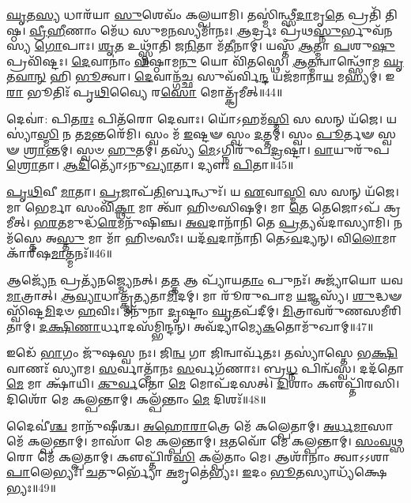 \-\ul{𑌘𑍃}\-𑌤\-\ul{𑌸𑍍𑌯} 𑌧𑌾𑌰᳴𑌯𑌾 \ul{𑌸𑍁}\-𑌶𑍇𑌵𑌂᳴ 𑌕𑌲𑍍𑌪𑌯𑌾𑌮𑌿।
𑌤𑌸𑍍𑌮𑌿॑𑌨𑍍𑌥𑍍𑌸𑍀\-\ul{𑌦𑌾}\-𑌮𑍃\-\ul{𑌤𑍇} 𑌪𑍍𑌰𑌤𑌿᳴ 𑌤𑌿𑌷𑍍𑌠।
\-\ul{𑌵𑍍𑌰𑍀}\-\-\ul{𑌹𑍀}\-𑌣𑌾𑌂 𑌮𑍇᳴𑌧 𑌸𑍁𑌮\-\ul{𑌨}\-𑌸𑍍𑌯𑌮𑌾᳴𑌨𑌃।
\-\ul{𑌆}\-𑌰𑍍𑌦𑍍𑌰𑌃 𑌪𑍍𑌰᳴𑌥\-\ul{𑌸𑍍𑌨𑍁}\-𑌰𑍍𑌭𑍁𑌵᳴𑌨𑌸𑍍𑌯 \ul{𑌗𑍋}\-𑌪𑌾𑌃।
\-\ul{𑌶𑍃}\-𑌤 𑌉𑌥𑍍𑌸𑍍𑌨𑌾᳴𑌤𑌿 𑌜\-\ul{𑌨𑌿}\-𑌤𑌾 𑌮᳴\-\ul{𑌤𑍀}\-𑌨𑌾𑌮𑍍।
𑌯𑌸𑍍𑌤᳴ \ul{𑌆}\-𑌤𑍍𑌮𑌾 \ul{𑌪}\-𑌶𑍁\-\ul{𑌷𑍁} 𑌪𑍍𑌰𑌵𑌿᳴𑌷𑍍𑌟𑌃।
\-\ul{𑌦𑍇}\-𑌵𑌾𑌨𑌾𑌂॑ \ul{𑌵𑌿}\-𑌷𑍍𑌠𑌾𑌮\-\ul{𑌨𑍁} 𑌯𑍋 𑌵𑌿᳴\-\ul{𑌤}\-𑌸𑍍𑌥𑍇।
\-\ul{𑌆}\-\-\ul{𑌤𑍍𑌮}\-𑌨𑍍𑌵𑌾𑌨𑍍𑌥𑍍𑌸𑍋᳴𑌮 \ul{𑌘𑍃}\-𑌤\-\ul{𑌵𑌾}\-\-\ul{𑌨𑍍} 𑌹𑌿 \ul{𑌭𑍂}\-𑌤𑍍𑌵𑌾।
\-\ul{𑌦𑍇}\-𑌵𑌾𑌨𑍍𑌗᳴\-\ul{𑌚𑍍𑌛} 𑌸𑍁𑌵᳴𑌰𑍍𑌵𑌿\-\ul{𑌨𑍍𑌦} 𑌯𑌜᳴𑌮𑌾𑌨𑌾\-\ul{𑌯} 𑌮𑌹𑍍𑌯𑌮𑍍॑।
𑌇\-\ul{𑌰𑌾} 𑌭𑍂𑌤𑌿𑌃᳴ 𑌪𑍃\-\ul{𑌥𑌿}\-𑌵𑍍𑌯𑍈 𑌰\-\ul{𑌸𑍋} 𑌮𑍋𑌤𑍍𑌕𑍍𑌰᳴𑌮𑍀𑌤𑍍॥44॥

𑌦𑍇𑌵𑌾॑: 𑌪𑌿𑌤\-\ul{𑌰𑌃} 𑌪𑌿𑌤᳴𑌰𑍋 𑌦𑍇𑌵𑌾𑌃।
𑌯𑍋᳴𑌽𑌹𑌮᳴\-\ul{𑌸𑍍𑌮𑌿} 𑌸 𑌸𑌨𑍍 𑌯᳴𑌜𑍇।
𑌯𑌸𑍍𑌯𑌾॑\-\ul{𑌸𑍍𑌮𑌿} 𑌨 𑌤\-\ul{𑌮}\-𑌨𑍍𑌤𑌰𑍇᳴𑌮𑌿।
𑌸𑍍𑌵𑌂 𑌮᳴ \ul{𑌇}\-𑌷𑍍𑌟𑍟 𑌸𑍍𑌵𑌂 \ul{𑌦}\-𑌤𑍍𑌤𑌮𑍍।
𑌸𑍍𑌵𑌂 \ul{𑌪𑍂}\-𑌰𑍍𑌤𑍟 𑌸𑍍𑌵𑍟 \ul{𑌶𑍍𑌰𑌾}\-𑌨𑍍𑌤𑌮𑍍।
𑌸𑍍𑌵𑍞 \ul{𑌹𑍁}\-𑌤𑌮𑍍।
𑌤𑌸𑍍𑌯᳴ \ul{𑌮𑍇}\-\-𑌽𑌗𑍍𑌨𑌿𑌰𑍁᳴𑌪\-\ul{𑌦𑍍𑌰}\-𑌷𑍍𑌟𑌾।
\-\ul{𑌵𑌾}\-𑌯𑍁𑌰𑍁᳴𑌪\-\ul{𑌶𑍍𑌰𑍋}\-𑌤𑌾।
\-\ul{𑌆}\-\-\ul{𑌦𑌿}\-𑌤𑍍𑌯𑍋᳴\-𑌽𑌨𑍁\-\ul{𑌖𑍍𑌯𑌾}\-𑌤𑌾।
𑌦𑍍𑌯𑍗𑌃 \ul{𑌪𑌿}\-𑌤𑌾॥45॥

\-\ul{𑌪𑍃}\-\-\ul{𑌥𑌿}\-𑌵𑍀 \ul{𑌮𑌾}\-𑌤𑌾।
\-\ul{𑌪𑍍𑌰}\-𑌜𑌾𑌪᳴\-\ul{𑌤𑌿}\-𑌰𑍍𑌬𑌨𑍍𑌧𑍁𑌃᳴।
𑌯 \ul{𑌏}\-𑌵𑌾\-\ul{𑌸𑍍𑌮𑌿} 𑌸 𑌸𑌨𑍍 𑌯᳴𑌜𑍇।
𑌮𑌾 𑌭𑍇𑌰𑍍𑌮𑌾 𑌸𑌂𑌵𑌿᳴\-\ul{𑌕𑍍𑌥𑌾} 𑌮𑌾 𑌤𑍍𑌵𑌾᳴ 𑌹𑌿𑍞𑌸𑌿𑌷𑌮𑍍।
𑌮𑌾 \ul{𑌤𑍇} 𑌤𑍇𑌜𑍋𑌽𑌪᳴ 𑌕𑍍𑌰𑌮𑍀𑌤𑍍।
\-\ul{𑌭}\-\-\ul{𑌰}\-𑌤𑌮𑍁𑌦𑍍𑌧᳴\-\ul{𑌰𑍇}\-𑌮𑌨𑍁᳴𑌷𑌿𑌞𑍍𑌚।
\-\ul{𑌅}\-\-\ul{𑌵}\-𑌦𑌾𑌨𑌾᳴𑌨𑌿 𑌤𑍇 \ul{𑌪𑍍𑌰}\-𑌤𑍍𑌯𑌵᳴𑌦𑌾𑌸𑍍𑌯𑌾𑌮𑌿।
𑌨𑌮᳴𑌸𑍍𑌤𑍇 𑌅\-\ul{𑌸𑍍𑌤𑍁} 𑌮𑌾 𑌮𑌾᳴ 𑌹𑌿𑍞𑌸𑍀𑌃।
𑌯𑌦᳴\-\ul{𑌵}\-𑌦𑌾𑌨𑌾᳴𑌨𑌿 𑌤𑍇𑌽\-\ul{𑌵}\-𑌦𑍍𑌯𑌨𑍍।
𑌵𑌿\-\ul{𑌲𑍋}\-𑌮𑌾𑌕𑌾᳴𑌰𑍍‌\mbox{}𑌷\-\ul{𑌮𑌾}\-𑌤𑍍𑌮𑌨𑌃᳴॥46॥

𑌆𑌜𑍍𑌯𑍇᳴\-\ul{𑌨} 𑌪𑍍𑌰𑌤𑍍𑌯᳴𑌨𑌜𑍍𑌮𑍍𑌯𑍇𑌨𑌤𑍍।
𑌤\-\ul{𑌤𑍍𑌤} 𑌆 𑌪𑍍𑌯𑌾᳴𑌯\-\ul{𑌤𑌾𑌂} 𑌪𑍁𑌨𑌃᳴।
𑌅𑌜𑍍𑌯𑌾᳴𑌯𑍋 𑌯𑌵\-\ul{𑌮𑌾}\-𑌤𑍍𑌰𑌾𑌤𑍍।
\-\ul{𑌆}\-\-\ul{𑌵𑍍𑌯𑌾}\-𑌧𑌾𑌤𑍍𑌕𑍃᳴𑌤𑍍𑌯𑌤𑌾\-\ul{𑌮𑌿}\-𑌦𑌮𑍍।
𑌮𑌾 𑌰𑍂᳴𑌰𑍁𑌪𑌾𑌮 \ul{𑌯}\-𑌜𑍍𑌞𑌸𑍍𑌯᳴।
\-\ul{𑌶𑍁}\-𑌦𑍍𑌧𑍟 𑌸𑍍𑌵𑌿᳴𑌷𑍍𑌟\-\ul{𑌮𑌿}\-𑌦𑍞 \ul{𑌹}\-𑌵𑌿𑌃।
𑌮𑌨𑍁᳴𑌨𑌾 \ul{𑌦𑍃}\-𑌷𑍍𑌟𑌾𑌂 \ul{𑌘𑍃}\-𑌤𑌪᳴𑌦𑍀𑌮𑍍।
\-\ul{𑌮𑌿}\-𑌤𑍍𑌰𑌾𑌵𑌰𑍁᳴𑌣𑌸𑌮𑍀𑌰𑌿𑌤𑌾𑌮𑍍।
\-\ul{𑌦}\-\-\ul{𑌕𑍍𑌷𑌿}\-\-\ul{𑌣𑌾}\-𑌰𑍍𑌧𑌾𑌦𑌸᳴𑌮𑍍𑌭𑌿𑌨𑍍𑌦𑌨𑍍।
𑌅𑌵᳴𑌦𑍍𑌯𑌾𑌮𑍍𑌯𑍇\-\-\ul{𑌕}\-𑌤𑍋𑌮𑍁᳴𑌖𑌾𑌮𑍍॥47॥

𑌇𑌡𑍇᳴ \ul{𑌭𑌾}\-𑌗𑌂 𑌜𑍁᳴𑌷𑌸𑍍𑌵 𑌨𑌃।
𑌜𑌿\-\ul{𑌨𑍍𑌵} 𑌗𑌾 𑌜𑌿𑌨𑍍𑌵𑌾𑌰𑍍𑌵᳴𑌤𑌃।
𑌤𑌸𑍍𑌯𑌾॑𑌸𑍍𑌤𑍇 𑌭\-\ul{𑌕𑍍𑌷𑌿}\-𑌵𑌾𑌣𑌃᳴ 𑌸𑍍𑌯𑌾𑌮।
\-\ul{𑌸}\-𑌰𑍍𑌵𑌾𑌤𑍍𑌮𑌾᳴𑌨𑌃 \ul{𑌸}\-𑌰𑍍𑌵𑌗᳴𑌣𑌾𑌃।
𑌬𑍍𑌰\-\ul{𑌧𑍍𑌨} 𑌪𑌿𑌨𑍍𑌵᳴𑌸𑍍𑌵।
𑌦𑌦᳴𑌤𑍋 \ul{𑌮𑍇} 𑌮𑌾 𑌕𑍍𑌷𑌾᳴𑌯𑌿।
\-\ul{𑌕𑍁}\-\-\ul{𑌰𑍍𑌵}\-𑌤𑍋 \ul{𑌮𑍇} 𑌮𑍋𑌪᳴𑌦𑌸𑌤𑍍।
\-\ul{𑌦𑌿}\-𑌶𑌾𑌂 𑌕𑍢𑌪𑍍𑌤𑌿᳴𑌰𑌸𑌿।
𑌦𑌿𑌶𑍋᳴ 𑌮𑍇 𑌕𑌲𑍍𑌪𑌨𑍍𑌤𑌾𑌮𑍍।
𑌕𑌲𑍍𑌪᳴𑌨𑍍𑌤𑌾𑌂 \ul{𑌮𑍇} 𑌦𑌿𑌶𑌃᳴॥48॥

𑌦𑍈𑌵𑍀॑\-\ul{𑌶𑍍𑌚} 𑌮𑌾𑌨𑍁᳴𑌷𑍀𑌶𑍍𑌚।
\-\ul{𑌅}\-\-\ul{𑌹𑍋}\-\-\ul{𑌰𑌾}\-𑌤𑍍𑌰𑍇 𑌮𑍇᳴ 𑌕𑌲𑍍𑌪𑍇𑌤𑌾𑌮𑍍।
\-\ul{𑌅}\-\-\ul{𑌰𑍍𑌧}\-\-\ul{𑌮𑌾}\-𑌸𑌾 𑌮𑍇᳴ 𑌕𑌲𑍍𑌪𑌨𑍍𑌤𑌾𑌮𑍍।
𑌮𑌾𑌸𑌾᳴ 𑌮𑍇 𑌕𑌲𑍍𑌪𑌨𑍍𑌤𑌾𑌮𑍍।
\-\ul{𑌋}\-𑌤𑌵𑍋᳴ 𑌮𑍇 𑌕𑌲𑍍𑌪𑌨𑍍𑌤𑌾𑌮𑍍।
\-\ul{𑌸𑌂}\-\-\ul{𑌵}\-\-\ul{𑌥𑍍𑌸}\-𑌰𑍋 𑌮𑍇᳴ 𑌕𑌲𑍍𑌪𑌤𑌾𑌮𑍍।
𑌕𑍢𑌪𑍍𑌤𑌿᳴𑌰\-\ul{𑌸𑌿} 𑌕𑌲𑍍𑌪᳴𑌤𑌾𑌂 𑌮𑍇।
𑌆𑌶𑌾᳴𑌨𑌾𑌂 𑌤𑍍𑌵𑌾\-𑌽𑌽𑌶𑌾\-\ul{𑌪𑌾}\-𑌲𑍇𑌭𑍍𑌯𑌃᳴।
\-\ul{𑌚}\-𑌤𑍁𑌰𑍍𑌭𑍍𑌯𑍋᳴ \ul{𑌅}\-𑌮𑍃𑌤𑍇॑𑌭𑍍𑌯𑌃।
\-\ul{𑌇}\-𑌦𑌂 \ul{𑌭𑍂}\-𑌤𑌸𑍍𑌯𑌾𑌧𑍍𑌯᳴𑌕𑍍𑌷𑍇𑌭𑍍𑌯𑌃॥49॥

